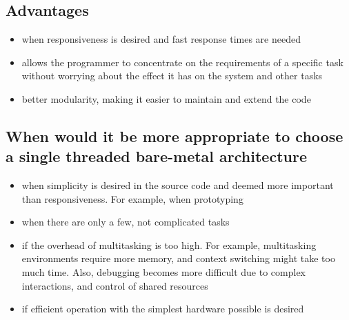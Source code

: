 \section{}
\subsection*{Advantages}
\begin{itemize}
  \item when responsiveness is desired and fast response times are needed
  \item allows the programmer to concentrate on the requirements of a
    specific task without worrying about the effect it has on the system and
    other tasks
  \item better modularity, making it easier to maintain and extend the code
\end{itemize}

\subsection*{When would it be more appropriate to choose a single threaded
  bare-metal architecture}

\begin{itemize}
  \item when simplicity is desired in the source code and deemed more important
    than responsiveness. For example, when prototyping
  \item when there are only a few, not complicated tasks
  \item if the overhead of multitasking is too high. For example, multitasking
    environments require more memory, and context switching might take too much
    time. Also, debugging becomes more difficult due to complex interactions,
    and control of shared resources
  \item if efficient operation with the simplest hardware possible is desired
\end{itemize}
